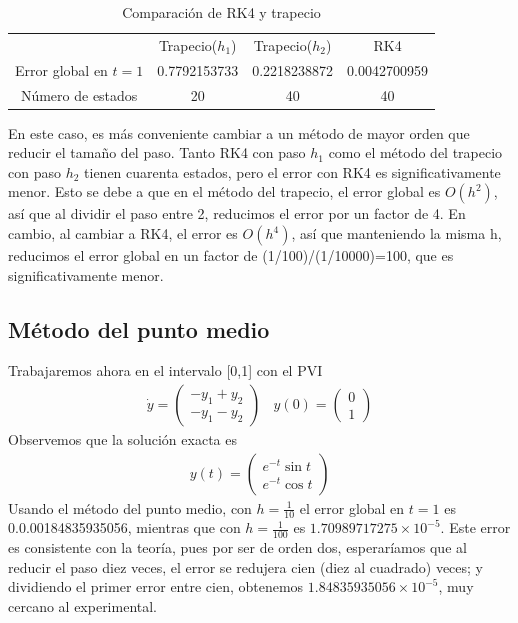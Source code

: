 \documentclass[spanish]{article}
\begin{document}
\begin{table}[h]
\caption{Comparación de RK4 y trapecio}
\centering
\begin{tabular}{cccc}
\hline \hline
$ $ & Trapecio($h_1$) & Trapecio($h_2$) & RK4 \\
Error global en $t=1$ & 0.7792153733  &  0.2218238872 & 0.0042700959 \\
Número de estados  &     20       &       40       &       40 \\
\hline
\end{tabular}
\end{table}
En este caso, es más conveniente cambiar a un método de mayor orden que reducir el
tamaño del paso. Tanto RK4 con paso $h_1$ como el método del trapecio con paso 
$h_2$ tienen cuarenta estados, pero el error con RK4 es significativamente menor.
Esto se debe a que en el método del trapecio, el error global es $O(h^2)$, así que al 
dividir el paso entre 2, reducimos el error por un factor de 4. En cambio, al 
cambiar a RK4, el error es $O(h^4)$, así que manteniendo  la misma h, reducimos el 
error global en un factor de (1/100)/(1/10000)=100, que es significativamente menor.

\noindent
\subsection{Método del punto medio}
Trabajaremos ahora en el intervalo [0,1] con el PVI 
\begin{align*}
\dot{y} = \begin{pmatrix}
-y_1+y_2 \\
-y_1-y_2
\end{pmatrix}
\ \ \ \ y(0) = \begin{pmatrix}
0  \\ 1
\end{pmatrix}
\end{align*}
Observemos que la solución exacta es 
\begin{align*}
y(t) = \begin{pmatrix}
e^{-t}\sin t\\
e^{-t} \cos t
\end{pmatrix}
\end{align*}
Usando el método del punto medio, con $h = \frac{1}{10}$ el error global en $t=1$ es  
0.0.00184835935056, mientras que con $h = \frac{1}{100}$ es $1.70989717275 \times 	
10^{-5}.$ Este error es consistente con la teoría, pues por ser de orden dos,
esperaríamos que al reducir el paso diez veces, el error se redujera cien (diez al 
cuadrado) veces; y dividiendo el primer error entre cien, obtenemos $1.84835935056
\times 10^{-5}$, muy cercano al experimental.
\end{document}
